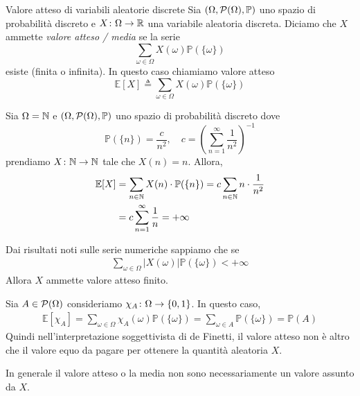 \documentclass[a4paper]{article}
\begin{document}
\begin{snippetdefinition}{Valore atteso di variabili aleatorie discrete}
    Sia \((\Omega, \mathcal P(\Omega), \mathbb P)\)
    uno spazio di probabilità discreto
    e \(X \colon \Omega \to \mathbb{R}\) una variabile aleatoria discreta.
    Diciamo che \(X\) ammette \emph{valore atteso / media}
    se la serie
    \[
        \sum_{\omega \in \Omega} X(\omega) \mathbb P(\{\omega\})
    \]
    esiste (finita o infinita).
    In questo caso chiamiamo valore atteso
    \[
        \mathbb E[X]
        \triangleq \sum_{\omega \in \Omega} X(\omega) \mathbb P(\{\omega\})
    \]
\end{snippetdefinition}

\begin{snippetexample}{}
    Sia \(\Omega = \mathbb{N}\) e \((\Omega, \mathcal P(\Omega), \mathbb P)\)
    uno spazio di probabilità discreto dove
    \[
        \mathbb P(\{n\}) = \frac{c}{n^2}, \quad c = \left(
            \sum_{n=1}^\infty \frac{1}{n^2}
        \right)^{-1}
    \]
    prendiamo \(X \colon \mathbb{N} \to \mathbb{N}\)
    tale che \(X(n) = n\).
    Allora,
    \begin{align*}
        \mathbb E[X] &= \sum_{n \in \mathbb{N}}
        X(n) \cdot \mathbb P(\{n\}) = c \sum_{n \in \mathbb{N}} n \cdot \frac{1}{n^2} \\
        &= c \sum_{n=1}^\infty \frac{1}{n} = +\infty
    \end{align*}
\end{snippetexample}

Dai risultati noti sulle serie numeriche sappiamo che se
\begin{align*}
    \sum_{\omega \in \Omega} |X(\omega)| \mathbb P(\{\omega\}) < +\infty
\end{align*}
Allora \(X\) ammette valore atteso finito.

Sia \(A \in \mathcal P(\Omega)\) consideriamo \(\chi_A \colon \Omega \to \{0,1\}\).
In questo caso,
\begin{align*}
    \mathbb E[\chi_A] = \sum_{\omega \in \Omega} \chi_A(\omega) \mathbb P(\{\omega\})
    = \sum_{\omega \in A} \mathbb P(\{\omega\}) = \mathbb P(A)
\end{align*}
Quindi nell'interpretazione soggettivista di de Finetti, il valore atteso non è altro che il valore
equo da pagare per ottenere la quantità aleatoria \(X\).

In generale il valore atteso o la media non sono necessariamente un valore assunto da \(X\).
\end{document}
